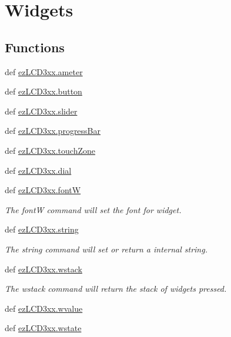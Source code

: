 \hypertarget{group___widgets}{\section{Widgets}
\label{group___widgets}
}
\subsection*{Functions}
\begin{DoxyCompactItemize}
\item 
def \hyperlink{group___widgets_ga01020dc360dfbd9f463bf5478e42566e}{ez\-L\-C\-D3xx.\-ameter}
\item 
def \hyperlink{group___widgets_ga7eeeb3ce522c7891c3f76cdc79f11192}{ez\-L\-C\-D3xx.\-button}
\item 
def \hyperlink{group___widgets_gafce5d2b8d149e7d84a27ca9740baefe3}{ez\-L\-C\-D3xx.\-slider}
\item 
def \hyperlink{group___widgets_ga1e17ba92ebcd90504fdc0f8fddb84bf0}{ez\-L\-C\-D3xx.\-progress\-Bar}
\item 
def \hyperlink{group___widgets_ga7a2150ae399ca581088ac55f421731cb}{ez\-L\-C\-D3xx.\-touch\-Zone}
\item 
def \hyperlink{group___widgets_ga8691bfb0f80929f4b4e09a83697532b8}{ez\-L\-C\-D3xx.\-dial}
\item 
def \hyperlink{group___widgets_gae5afb2a11476aad1d2cc0293d8e68717}{ez\-L\-C\-D3xx.\-font\-W}
\begin{DoxyCompactList}\small\item\em The font\-W command will set the font for widget. \end{DoxyCompactList}\item 
def \hyperlink{group___widgets_ga606e61e5ba0ea6ae6ada021e7c021b39}{ez\-L\-C\-D3xx.\-string}
\begin{DoxyCompactList}\small\item\em The string command will set or return a internal string. \end{DoxyCompactList}\item 
def \hyperlink{group___widgets_ga70b40969e280a9c315b84c18848309ca}{ez\-L\-C\-D3xx.\-wstack}
\begin{DoxyCompactList}\small\item\em The wstack command will return the stack of widgets pressed. \end{DoxyCompactList}\item 
def \hyperlink{group___widgets_ga7eaa2fac8abbadf04fa9afb49702906a}{ez\-L\-C\-D3xx.\-wvalue}
\item 
def \hyperlink{group___widgets_gaada0b335d54904b4f4517755ace97e47}{ez\-L\-C\-D3xx.\-wstate}
\end{DoxyCompactItemize}


